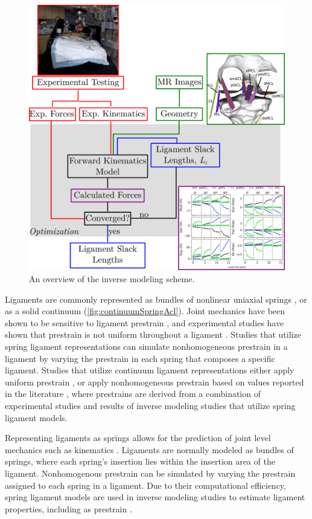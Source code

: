 \begin{figure}
    \centering
    \includegraphics[width=0.75\linewidth]{../img/InverseModelingFlowChart.png}
    \caption{An overview of the inverse modeling scheme.}
    \label{fig:inverseModelingScheme}
\end{figure}


Ligaments are commonly represented as bundles of nonlinear uniaxial springs \citep{blankevoort_validation_1996,baldwin_efficient_2009,ewing_estimating_2015}, or as a solid continuum \citep{gardiner_subject-specific_2003,pena_three-dimensional_2006,dhaher_effect_2010} (\autoref{fig:continuumSpringAcl}). Joint mechanics have been shown to be sensitive to ligament prestrain \citep{baldwin_efficient_2009}, and experimental studies have shown that prestrain is not uniform throughout a ligament \citep{hull_strain_1996,gardiner_strain_2001}. Studies that utilize spring ligament representations can simulate nonhomogeneous prestrain in a ligament by varying the prestrain in each spring that composes a specific ligament. Studies that utilize continuum ligament representations either apply uniform prestrain \citep{limbert_three-dimensional_2004,song_three-dimensional_2004,beidokhti_influence_2017}, or apply nonhomogeneous prestrain based on values reported in the literature \citep{pena_three-dimensional_2006,dhaher_effect_2010}, where prestrains are derived from a combination of experimental studies and results of inverse modeling studies that utilize spring ligament models.

Representing ligaments as springs allows for the prediction of joint level mechanics such as kinematics \citep{weiss_computational_2001}. Ligaments are normally modeled as bundles of springs, where each spring's insertion lies within the insertion area of the ligament. Nonhomogenous prestrain can be simulated by varying the prestrain assigned to each spring in a ligament. Due to their computational efficiency, spring ligament models are used in inverse modeling studies to estimate ligament properties, including as prestrain \citep{blankevoort_validation_1996,baldwin_dynamic_2012,ewing_estimating_2015,harris_combined_2016}.

